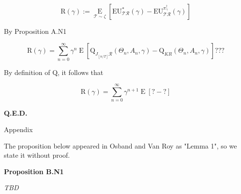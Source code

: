 \documentclass[a4paper]{article}
\newcommand{\Co}[1]{}
\DeclareMathOperator{\Supp}{supp}
\newcommand{\AP}[1]{\left(#1\right)}
\newcommand{\AB}[1]{\left[#1\right]}
\newcommand{\E}[1]{\underset{#1}{\operatorname{E}}}
\newcommand{\Ea}[2]{\underset{#1}{\operatorname{E}}\AB{#2}}
\newcommand{\D}{\mathrm{d}}
\newcommand{\Nats}{\mathbb{N}}
\newcommand{\Abs}[1]{\left\vert #1 \right\vert}
\newcommand{\Floor}[1]{\left\lfloor #1 \right\rfloor}
\newcommand{\K}{\xrightarrow{\mathrm{k}}}
\newcommand{\A}{\mathcal{A}}
\newcommand{\R}{\mathcal{R}}
\newcommand{\T}{\mathcal{T}}
\newcommand{\V}{\mathrm{V}}
\newcommand{\Q}{\mathrm{Q}}
\newcommand{\EU}{\mathrm{EU}}
\newcommand{\Reg}{\mathrm{R}}
\begin{document}
$$\Reg(\gamma):=\Ea{\T\sim\zeta}{\EU^*_{\T\R}(\gamma)-\EU^{\pi_{\gamma}^{\dagger}}_{\T\R}(\gamma)}$$

By Proposition A.N1

$$\Reg(\gamma)=\sum_{n=0}^\infty\gamma^{n}\Ea{}{\Q_{J_{\Floor{n/T}}\R}\AP{\Theta_n,A_n,\gamma}-\Q_{KR}\AP{\Theta_n,A_n,\gamma}}???$$

By definition of $\Q$, it follows that

$$\Reg(\gamma)=\sum_{n=0}^\infty\gamma^{n+1}\Ea{}{?-?}$$


 
 


\textbf{Q.E.D.}\Co{b}

\begin{Huge}Appendix\end{Huge}

The proposition below appeared in Osband and Van Roy as "Lemma 1", so we state it without proof.

\textbf{Proposition B.N1}\Co{b}

\textit{TBD}\Co{i}

\Co{...

\textbf{Proposition B.N3}\Co{b}

Consider some $\gamma\in(0,1)$, $\tau\in(0,\infty)$, $T\in\Nats^+$, a universe..., some $\pi^*: ? \rightarrow \A$ and some $\pi^0: ? \K \A$. Assume that $\gamma \geq \gamma_M$. For any $n \in \Nats$, let $\pi^*_n$ be a policy s.t. for any $h \in ?$

$$\pi^*_n(h):=\begin{cases} \pi^0(h) \text{ if } \Abs{h} < nT \\ \pi^*(h) \text{ otherwise} \end{cases}$$

Assume that for any $h \in ?$

i. $$\pi^*(s) \in \A_{M}^\omega\AP{S(h)}$$

ii. $$\Supp{\pi^0(h)} \subseteq \A_{M}^0\AP{S(h)}$$

iii. For any $\theta\in(\gamma,1)$ $$\Abs{\frac{\D\V_{M}\AP{S(h),\theta}}{\D\theta}} \leq \tau$$

Then

$$\EU^{*}_\upsilon(\gamma)-\EU^{\pi^0}_\upsilon(\gamma) \leq (1-\gamma)\sum_{n=0}^\infty \sum_{m=0}^{T-1} \gamma^{nT+m}\left(\E{x\sim\mu\bowtie\pi^*_n}\left[r\left(x_{:nT+m}\right)\right]-\E{x\sim\mu\bowtie\pi^0}\left[r\left(x_{:nT+m}\right)\right]\right) + \frac{2\tau\gamma^T(1-\gamma)}{1-\gamma^T}$$}
\end{document}
